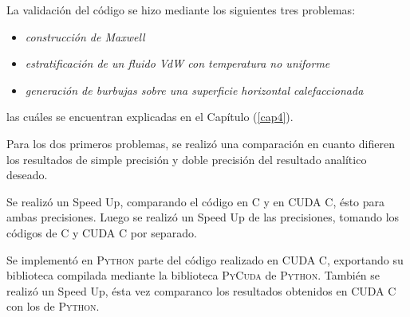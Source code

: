 La validación del código se hizo mediante los siguientes tres problemas:
\begin{itemize}
	\item \textit{construcción de Maxwell}
	\item \textit{estratificación de un fluido VdW con temperatura no uniforme}
	\item \textit{generación de burbujas sobre una superficie horizontal calefaccionada}
\end{itemize} 

las cuáles se encuentran explicadas en el Capítulo (\ref{cap4}).

Para los dos primeros problemas, se realizó una comparación en cuanto difieren los resultados de simple precisión y doble precisión del resultado analítico deseado. 

Se realizó un Speed Up, comparando el código en \textsc{C} y en \textsc{CUDA C}, ésto para ambas precisiones. Luego se realizó un Speed Up de las precisiones, tomando los códigos de \textsc{C} y \textsc{CUDA C} por separado.

Se implementó en \textsc{Python} parte del código realizado en \textsc{CUDA C}, exportando su biblioteca compilada mediante la biblioteca \textsc{PyCuda} de \textsc{Python}. También se realizó un Speed Up, ésta vez comparanco los resultados obtenidos en \textsc{CUDA C} con los de \textsc{Python}.


